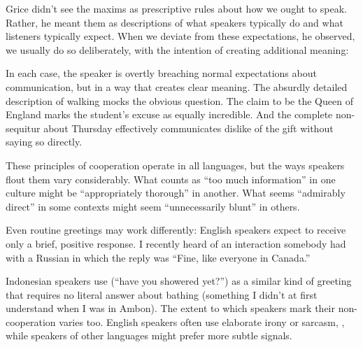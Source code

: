 Grice didn't see the maxims as prescriptive rules about how we ought to speak. Rather, he meant them as descriptions of what speakers typically do and what listeners typically expect. When we deviate from these expectations, he observed, we usually do so deliberately, with the intention of creating additional meaning:

\ea
   \z
\z
In each case, the speaker is overtly breaching normal expectations about communication, but in a way that creates clear meaning. The absurdly detailed description of walking mocks the obvious question. The claim to be the Queen of England marks the student's excuse as equally incredible. And the complete non-sequitur about Thursday effectively communicates dislike of the gift without saying so directly.

These principles of cooperation operate in all languages, but the ways speakers flout them vary considerably. What counts as \enquote{too much information} in one culture might be \enquote{appropriately thorough} in another. What seems \enquote{admirably direct} in some contexts might seem \enquote{unnecessarily blunt} in others. 

Even routine greetings may work differently: English speakers expect  to receive only a brief, positive response. I recently heard of an interaction somebody had with a Russian in which the reply was \enquote{Fine, like everyone in Canada.}

Indonesian speakers use  (\enquote{have you showered yet?}) as a similar kind of greeting that requires no literal answer about bathing (something I didn't at first understand when I was in Ambon). The extent to which speakers mark their non-cooperation varies too. English speakers often use elaborate irony or sarcasm, , while speakers of other languages might prefer more subtle signals.

